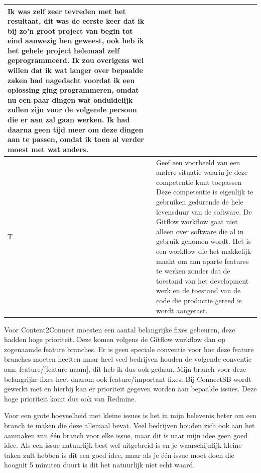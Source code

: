 \begin{tabularx}{\textwidth}{| l | X |}
\newline
Ik was zelf zeer tevreden met het resultaat, dit was de eerste keer dat ik bij zo'n groot project van begin tot eind aanwezig ben geweest, ook heb ik het gehele project helemaal zelf geprogrammeerd. Ik zou overigens wel willen dat ik wat langer over bepaalde zaken had nagedacht voordat ik een oplossing ging programmeren, omdat nu een paar dingen wat onduidelijk zullen zijn voor de volgende persoon die er aan zal gaan werken. Ik had daarna geen tijd meer om deze dingen aan te passen, omdat ik toen al verder moest met wat anders.
\\
\hline
T & Geef een voorbeeld van een andere situatie waarin je deze competentie kunt toepassen
\newline
\newline
Deze competentie is eigenlijk te gebruiken gedurende de hele levensduur van de software. De Gitflow workflow gaat niet alleen over software die al in gebruik genomen wordt. Het is een workflow die het makkelijk maakt om aan aparte features te werken zonder dat de toestand van het development werk en de toestand van de code die productie gereed is wordt aangetast.
\\
\hline
\end{tabularx}

\newline

Voor Content2Connect moesten een aantal belangrijke fixes gebeuren, deze hadden hoge prioriteit. Deze komen volgens de Gitflow workflow dan op zogenaamde feature branches. Er is geen speciale conventie voor hoe deze feature branches moeten heetten maar heel veel bedrijven houden de volgende conventie aan: feature/[feature-naam], dit heb ik dus ook gedaan. Mijn branch voor deze belangrijke fixes heet daarom ook feature/important-fixes. Bij ConnectSB wordt gewerkt met \nocite{JK:Redmine} en hierbij kan er prioriteit gegeven worden aan bepaalde issues. Deze hoge prioriteit komt dus ook van Redmine.

Voor een grote hoeveelheid met kleine issues is het in mijn belevenis beter om een branch te maken die deze allemaal bevat. Veel bedrijven houden zich ook aan het aanmaken van één branch voor elke issue, maar dit is naar mijn idee geen goed idee. Als een issue natuurlijk best wel uitgebreid is en je waarschijnlijk kleine taken zult hebben is dit een goed idee, maar als je één issue moet doen die hooguit 5 minuten duurt is dit het natuurlijk niet echt waard.

\newline

